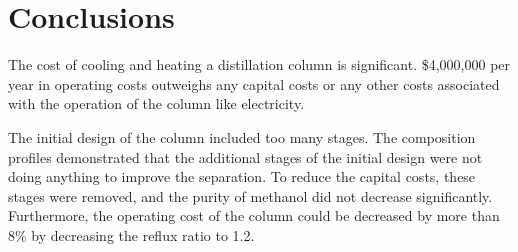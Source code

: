 \documentclass[12pt]{article}
\begin{document}
\section{Conclusions}

The cost of cooling and heating a distillation column is significant. \$4,000,000 per year in operating costs outweighs any capital costs or any other costs associated with the operation of the column like electricity.

The initial design of the column included too many stages. The composition profiles demonstrated that the additional stages of the initial design were not doing anything to improve the separation. To reduce the capital costs, these stages were removed, and the purity of methanol did not decrease significantly. Furthermore, the operating cost of the column could be decreased by more than 8\% by decreasing the reflux ratio to 1.2.
\end{document}

